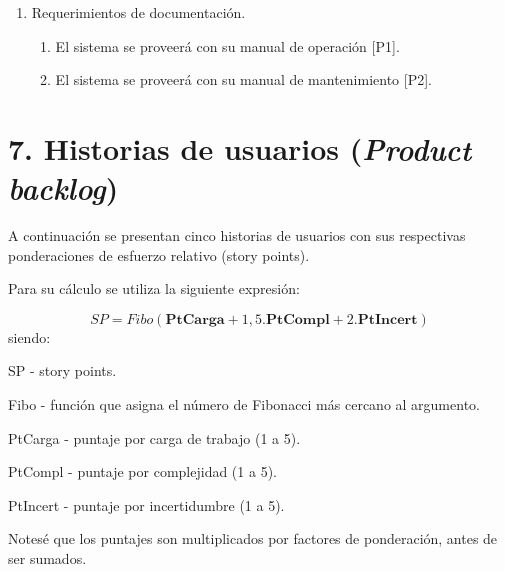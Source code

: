 \documentclass[
11pt, %
codirector, %
]{charter}
\begin{document}
\begin{enumerate}
\item Requerimientos de documentación.
\begin{enumerate}
\item El sistema se proveerá con su manual de operación [P1].
\item El sistema se proveerá con su manual de mantenimiento [P2]. 
\end{enumerate}		


\end{enumerate}

\section{7. Historias de usuarios (\textit{Product backlog})}
\label{sec:backlog}

A continuación se presentan cinco historias de usuarios con sus respectivas ponderaciones de esfuerzo relativo (story points).

Para su cálculo se utiliza la siguiente expresión:

\begin{equation}
SP = Fibo (\textbf{PtCarga} + 1,5.\textbf{PtCompl} + 2.\textbf{PtIncert})
\end{equation}
siendo:

SP - story points.

Fibo - función que asigna el número de Fibonacci más cercano al argumento.

PtCarga - puntaje por carga de trabajo (1 a 5).

PtCompl - puntaje por complejidad (1 a 5).

PtIncert - puntaje por incertidumbre (1 a 5).

Notesé que los puntajes son multiplicados por factores de ponderación, antes de ser sumados.
\end{document}
